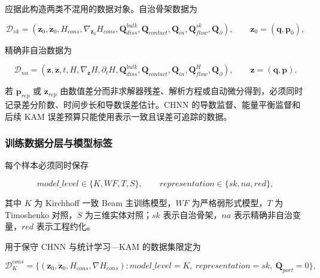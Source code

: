 应据此构造两类不混用的数据对象。自治骨架数据为

\begin{equation}
\label{eq:galerkin-2-121}
\mathcal{D}_{sk} = \left( \mathbf{z}_{0},{\dot{\mathbf{z}}}_{0},H_{cons},\nabla_{\mathbf{z}_{0}}H_{cons},\mathbf{Q}_{diss}^{bulk},\mathbf{Q}_{contact},\mathbf{Q}_{in},\mathbf{Q}_{flow}^{sk},\mathbf{Q}_{\partial} \right),\quad\quad\mathbf{z}_{0} = \left( \mathbf{q},\mathbf{p}_{0} \right),
\end{equation}

精确非自治数据为

\begin{equation}
\label{eq:galerkin-2-122}
\mathcal{D}_{na} = \left( \mathbf{z},\dot{\mathbf{z}},t,H,\nabla_{\mathbf{z}}H,\partial_{t}H,\mathbf{Q}_{diss}^{bulk},\mathbf{Q}_{contact},\mathbf{Q}_{in},\mathbf{Q}_{flow}^{H},\mathbf{Q}_{\partial} \right),\quad\quad\mathbf{z} = \left( \mathbf{q},\mathbf{p} \right).
\end{equation}

若 \({\dot{\mathbf{p}}}_{rep}\) 或 \({\dot{\mathbf{z}}}_{rep}\) 由数值差分而非求解器残差、解析方程或自动微分得到，必须同时记录差分阶数、时间步长和导数误差估计。CHNN 的导数监督、能量平衡监督和后续 KAM 误差预算只能使用表示一致且误差可追踪的数据。

\subsubsection{训练数据分层与模型标签}\label{sec:galerkin-2-11-3}

每个样本必须同时保存

\begin{equation}
\label{eq:galerkin-2-123}
model\_ level \in \{ K,WF,T,S\},\quad\quad representation \in \{ sk,na,red\},
\end{equation}

其中 \(K\) 为 Kirchhoff 一致 Beam 主训练模型，\(WF\) 为严格弱形式模型，\(T\) 为 Timoshenko 对照，\(S\) 为三维实体对照；\(sk\) 表示自治骨架，\(na\) 表示精确非自治变量，\(red\) 表示工程约化。

用于保守 CHNN 与统计学习---KAM 的数据集限定为

\begin{equation}
\label{eq:galerkin-2-124}
\mathcal{D}_{K}^{cons} = \{\left( \mathbf{z}_{0},{\dot{\mathbf{z}}}_{0},H_{cons},\nabla H_{cons} \right):model\_ level = K,\ representation = sk,\ \mathbf{Q}_{port} = 0\},
\end{equation}

